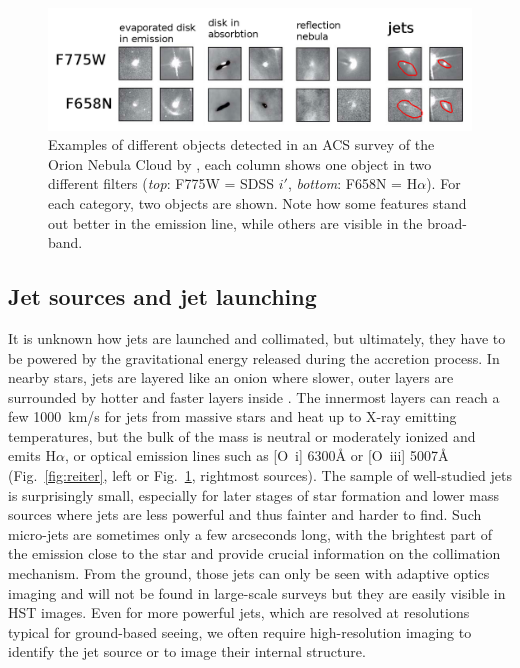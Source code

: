 \documentclass[12pt]{article}
\begin{document}
\begin{figure}
    \centering
    \includegraphics[width=\textwidth]{ONCACS.png}
    \caption{Examples of different objects detected in an ACS survey of the Orion Nebula Cloud by \citet{2008AJ....136.2136R}, each column shows one object in two different filters (\emph{top}: F775W = SDSS $i'$, \emph{bottom}: F658N = H$\alpha$). For each category, two objects are shown. Note how some features stand out better in the emission line, while others are visible in the broad-band.}
    \label{fig:ONCACS}
\end{figure}

\subsection{Jet sources and jet launching}
It is unknown how jets are launched and collimated, but ultimately, they have
to be powered by the gravitational energy released during the accretion process. In
nearby stars, jets are layered like an onion where slower, outer layers are
surrounded by hotter and faster layers inside \citep{1993ApJ...409..748G,2000ApJ...537L..49B}. The
innermost layers can reach a few 1000~km/s for jets from massive stars and heat
up to X-ray emitting temperatures, but the bulk of the mass is neutral or
moderately ionized and emits H$\alpha$, or optical emission lines such as
[O~{\sc i}] 6300\AA{} or [O~{\sc iii}] 5007\AA{} (Fig.~\ref{fig:reiter},
left or Fig.~\ref{fig:ONCACS}, rightmost sources). The sample of well-studied jets is surprisingly small, especially for
later stages of star formation and lower mass sources where jets are less
powerful and thus fainter and harder to find. Such micro-jets are sometimes
only a few arcseconds long, with the brightest part of the emission close to
the star and provide crucial information on the collimation mechanism. From the ground, those jets can only be seen with adaptive optics
imaging and will not be found in large-scale surveys but they are easily
visible in HST images. Even for more powerful jets, which are resolved at
resolutions typical for ground-based seeing, we often require high-resolution
imaging to identify the jet source or to image their internal structure.
\end{document}
